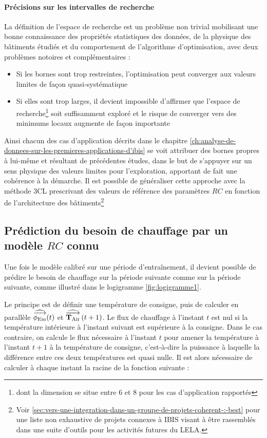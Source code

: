             \paragraph{Précisions sur les intervalles de recherche}
                La définition de l'espace de recherche est un problème non trivial mobilisant une bonne connaissance des propriétés statistiques des données, de la physique des bâtiments étudiés et du comportement de l'algorithme d'optimisation, avec deux problèmes notoires et complémentaires :
                \begin{itemize}
                    \item Si les bornes sont trop restreintes, l'optimisation peut converger aux valeurs limites de façon quasi-systématique
                    \item Si elles sont trop larges, il devient impossible d'affirmer que l'espace de recherche\footnote{dont la dimension se situe entre 6 et 8 pour les cas d'application rapportés} soit suffisamment exploré et le risque de converger vers des minimums locaux augmente de façon importante
                \end{itemize}
                Ainsi chacun des cas d'application décrits dans le chapitre \ref{ch:analyse-de-donnees-sur-les-premieres-applications-d'ibis} se voit attribuer des bornes propres à lui-même et résultant de précédentes études, dans le but de s'appuyer sur un sens physique des valeurs limites pour l'exploration, apportant de fait une cohérence à la démarche.
                Il est possible de généraliser cette approche avec la méthode 3CL prescrivant des valeurs de référence des paramètres $RC$ en fonction de l'architecture des bâtiments\footnote{Voir \ref{sec:vers-une-integration-dans-un-groupe-de-projets-coherent-:-best} pour une liste non exhaustive de projets connexes à IBIS visant à être rassemblés dans une suite d'outils pour les activités futures du LELA.}
            \newpage
    \subsection{Prédiction du besoin de chauffage par un modèle $RC$ connu}\label{subsec:prediction-du-besoin-de-chauffage-par-un-modele-$rc$-connu}
        Une fois le modèle calibré sur une période d'entraînement, il devient possible de prédire le besoin de chauffage sur la période suivante comme sur la période suivante, comme illustré dans le logigramme \ref{fig:logigramme1}.

        Le principe est de définir une température de consigne, puis de calculer en parallèle $\operatorname{\widehat{\overrightarrow{\phi_{\text{Em}}}}}(t)$ et $\operatorname{\widehat{\overrightarrow{\mathbf{T}_{\text{Air}}}}}\left(t+1\right)$.
        Le flux de chauffage à l'instant $t$ est nul si la température intérieure à l'instant suivant est supérieure à la consigne.
        Dans le cas contraire, on calcule le flux nécessaire à l'instant $t$ pour amener la température à l'instant $t+1$ à la température de consigne,
        c'est-à-dire la puissance à laquelle la différence entre ces deux températures est quasi nulle.
        Il est alors nécessaire de calculer à chaque instant la racine de la fonction suivante :

